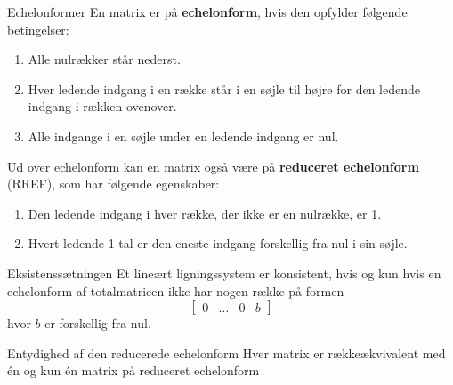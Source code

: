 \begin{definition}{Echelonformer}
En matrix er på \textbf{echelonform}, hvis den opfylder følgende betingelser:
\begin{enumerate}
    \item Alle nulrækker står nederst.
    \item Hver ledende indgang i en række står i en søjle til højre for den ledende indgang i rækken ovenover.
    \item Alle indgange i en søjle under en ledende indgang er nul.
\end{enumerate}

Ud over echelonform kan en matrix også være på \textbf{reduceret echelonform} (RREF), som har følgende egenskaber:
\begin{enumerate}[resume]
    \item Den ledende indgang i hver række, der ikke er en nulrække, er 1.
    \item Hvert ledende 1-tal er den eneste indgang forskellig fra nul i sin søjle.
\end{enumerate}
\end{definition}

\begin{theorem}{Eksistenssætningen}
Et lineært ligningssystem er konsistent, hvis og kun hvis en echelonform af totalmatricen ikke har nogen række på formen
    \[
    \left[\begin{array}{llll}
    0 & \ldots & 0 & b
    \end{array}\right]
    \]
hvor $b$ er forskellig fra nul.
\end{theorem}

\begin{theorem}{Entydighed af den reducerede echelonform}
    Hver matrix er rækkeækvivalent med én og kun én matrix på reduceret echelonform
\end{theorem}

